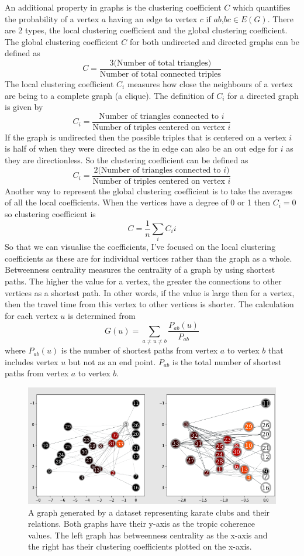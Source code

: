 \documentclass[12pt]{article}
\begin{document}
An additional property in graphs is the clustering coefficient $C$ which quantifies the probability of a vertex $a$ having an edge to vertex $c$ if $ab$,$bc \in E(G)$. There are 2 types, the local clustering coefficient and the global clustering coefficient\cite{3}. The global clustering coefficient $C$ for both undirected and directed graphs can be defined as 
$$ C = \frac{3\text{(Number of total triangles)}}{\text{Number of total connected triples}} $$
The local clustering coefficient $C_i$ measures how close the neighbours of a vertex are being to a complete graph (a clique). The definition of $C_i$ for a directed graph is given by
$$ C_i = \frac{\text{Number of triangles connected to $i$}}{\text{Number of triples centered on vertex $i$}}$$
If the graph is undirected then the possible triples that is centered on a vertex $i$ is half of when they were directed as the in edge can also be an out edge for $i$ as they are directionless. So the clustering coefficient can be defined as 
$$ C_i = \frac{2\text{(Number of triangles connected to $i$)}}{\text{Number of triples centered on vertex $i$}}$$
Another way to represent the global clustering coefficient is to take the averages of all the local coefficients. When the vertices have a degree of 0 or 1 then $C_i = 0$ so clustering coefficient is 
$$ C = \frac{1}{n}\sum_i{C_i}i$$
So that we can visualise the coefficients, I've focused on the local clustering coefficients as these are for individual vertices rather than the graph as a whole.
\\
Betweenness centrality\cite{4} measures the centrality of a graph by using shortest paths. The higher the value for a vertex, the greater the connections to other vertices as a shortest path. In other words, if the value is large then for a vertex, then the travel time from this vertex to other vertices is shorter. The calculation for each vertex $u$ is determined from 
$$ G(u)=\sum_{a\ne u\ne b}\frac{P_{ab}(u)}{P_{ab}}$$
where $P_{ab}(u)$ is the number of shortest paths from vertex $a$ to vertex $b$ that includes vertex $u$ but not as an end point. $P_{ab}$ is the total number of shortest paths from vertex $a$ to vertex $b$.
\begin{figure}[H]
	\centering
	\includegraphics[width=\linewidth]{graphs.jpg}
	\caption{A graph generated by a dataset representing karate clubs and their relations. Both graphs have their y-axis as the tropic coherence values. The left graph has betweenness 			centrality as the x-axis and the right has their clustering coefficients plotted on the x-axis.}
	\label{fig:graph}
\end{figure}
\end{document}
